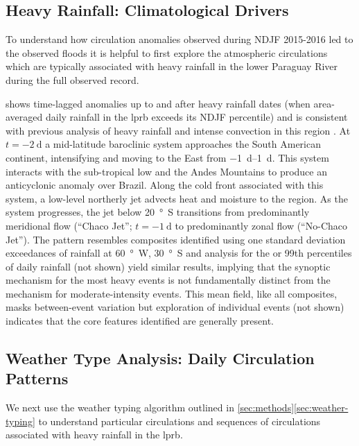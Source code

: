 \documentclass{ametsoc}
\begin{document}
\subsection{Heavy Rainfall: Climatological Drivers} \label{sec:rainfall-circulation}

To understand how circulation anomalies observed during NDJF 2015-2016 led to the observed floods it is helpful to first explore the atmospheric circulations which are typically associated with heavy rainfall in the lower Paraguay River during the full observed record.

 shows time-lagged anomalies up to and after heavy rainfall dates (when area-averaged daily rainfall in the \gls{lprb} exceeds its NDJF  percentile) and is consistent with previous analysis of heavy rainfall and intense convection in this region \citep{Liebmann2004,Marengo2004,Salio2007,Marwan2015}.
At $t=\SI{-2}{\day}$ a mid-latitude baroclinic system approaches the South American continent, intensifying and moving to the East from \SIrange{-1}{1}{\day}.
This system interacts with the sub-tropical low and the Andes Mountains to produce an anticyclonic anomaly over Brazil.
Along the cold front associated with this system, a low-level northerly jet advects  heat and moisture to the region.
As the system progresses, the jet below \SI{20}{\degree S} transitions from predominantly meridional flow (``Chaco Jet''; $t=\SI{-1}{\day}$ to predominantly zonal flow (``No-Chaco Jet'').
The pattern resembles composites identified using one standard deviation exceedances of rainfall at \SI{60}{\degree W}, \SI{30}{\degree S} \citep{Liebmann2004} and analysis for the  or 99th percentiles of daily rainfall (not shown) yield similar results, implying that the synoptic mechanism for the most heavy events is not fundamentally distinct from the mechanism for moderate-intensity events.
This mean field, like all composites, masks between-event variation but exploration of individual events (not shown) indicates that the core features identified are generally present.

\subsection{Weather Type Analysis: Daily Circulation Patterns} \label{sec:weather-types}

We next use the weather typing algorithm outlined in \cref{sec:methods}\ref{sec:weather-typing} to understand particular circulations and sequences of circulations associated with heavy rainfall in the \gls{lprb}.
\end{document}
